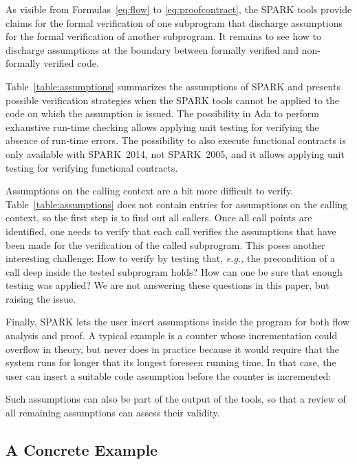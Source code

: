 \documentclass{llncs}
\newcommand{\oldspark}{SPARK~2005\xspace}
\newcommand{\newspark}{SPARK~2014\xspace}
\newcommand{\spark}{SPARK\xspace}
\newcommand{\eg}{\textit{e.g.,}\xspace}
\begin{document}
As visible from Formulas~\ref{eq:flow} to \ref{eq:proofcontract}, the \spark tools
provide claims for the formal verification of one subprogram that discharge
assumptions for the formal verification of another subprogram. It remains to
see how to discharge assumptions at the boundary between formally verified and
non-formally verified code.

Table~\ref{table:assumptions} summarizes the assumptions of \spark and presents
possible verification strategies when the \spark tools cannot be applied to the
code on which the assumption is issued.  The possibility in Ada to perform
exhaustive run-time checking allows applying unit testing for verifying the
absence of run-time errors.  The possibility to also execute functional
contracts is only available with \newspark, not \oldspark, and it allows
applying unit testing for verifying functional contracts.

Assumptions on the calling context are a bit more difficult to verify.
Table~\ref{table:assumptions} does not contain entries for
assumptions on the calling context, so the first step is to find out all
callers. Once all call points are identified, one needs to verify that each
call verifies the assumptions that have been made for the verification of the
called subprogram. This poses another interesting challenge: How to verify
by testing that, \eg the precondition of a call deep inside the tested
subprogram holds?
How can one be sure that enough testing was applied?
We are not answering these questions in this paper, but raising the
issue.

Finally, \spark lets the user insert assumptions inside the program for both flow
analysis and proof. A typical example is a counter whose
incrementation could overflow in theory, but never does in practice because
it would require that the system runs for longer that its longest foreseen running time.
In that case, the user can insert a suitable code assumption before the counter
is incremented:

Such assumptions can also be part of the output of the tools, so that a review of all
remaining assumptions can assess their validity.

\subsection{A Concrete Example}
\end{document}
